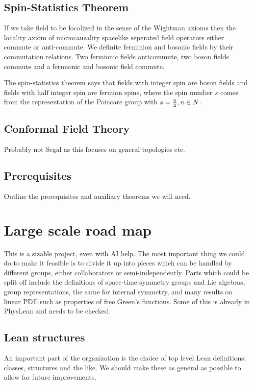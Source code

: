 \documentclass{article}
\newcommand{\1}{\mathbbm{1}}
\theoremstyle{plain}
\theoremstyle{definition}
\numberwithin{equation}{section}
\begin{document}
\subsection{Spin-Statistics Theorem}\label{spintheorem}

If we take field to be localized in the sense of the Wightman axioms then the locality axiom of microcausality spacelike seperated field operators either commute or anti-commute. We definite ferminion and bosonic fields by their commutation relations. Two fermionic fields anticommute, two boson fields commute and a fermionic and bosonic field commute. 

The spin-statistics theorem says that fields with integer spin are boson fields and fields with half integer spin are fermion spins, where the spin number $s$ comes from the representation of the Poincare group with $s= {n \over 2}, n \in N$. 


\subsection{Conformal Field Theory}

Probably not Segal as this focuses on general topologies etc. 


\subsection{Prerequisites}
Outline the prerequisites and auxiliary theorems we will need.

\section{Large scale road map}

This is a sizable project, even with AI help.
The most important thing we could do to make it feasible is to divide it up into pieces
which can be handled by different groups, either collaborators or semi-independently.
Parts which could be split off include the definitions of space-time symmetry groups and Lie algebras,
group representations, the same for internal symmetry, and many results on linear PDE such as
properties of free Green's functions.  Some of this is already in PhysLean and needs to be checked.

\subsection{Lean structures}

An important part of the organization is the choice of top level Lean definitions: classes, structures and the like.
We should make these as general as possible to allow for future improvements.
\end{document}
